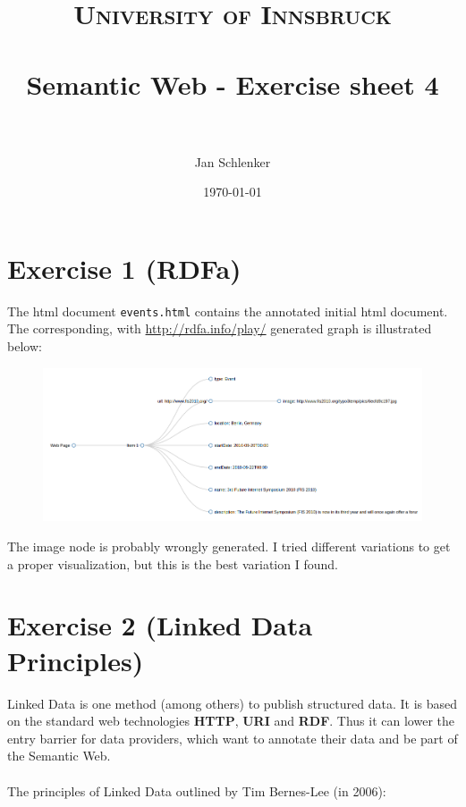 \documentclass[paper=a4, fontsize=12pt]{scrartcl} %
\title{	
\normalfont \normalsize 
\textsc{University of Innsbruck} \\ [25pt] %
\horrule{0.5pt} \\[0.4cm] %
\huge Semantic Web - Exercise sheet 4 \\ %
\horrule{2pt} \\[0.5cm] %
}
\author{Jan Schlenker} %
\date{\normalsize\today} %
\begin{document}
\maketitle %


\section{Exercise 1 (RDFa)}

The html document \texttt{events.html} contains the annotated initial html document. The corresponding, with \href{http://rdfa.info/play/}{http://rdfa.info/play/} generated graph is illustrated below:

\begin{figure}[htbp]
  \centering
  \includegraphics[width=\textwidth]{graph.png}
\end{figure}

The image node is probably wrongly generated. I tried different variations to get a proper visualization, but this is the best variation I found.



\section{Exercise 2 (Linked Data Principles)}

Linked Data is one method (among others) to publish structured data. It is based on the standard web technologies \textbf{HTTP}, \textbf{URI} and \textbf{RDF}. Thus it can lower the entry barrier for data providers, which want to annotate their data and be part of the Semantic Web. \\
\\
The principles of Linked Data outlined by Tim Bernes-Lee (in 2006):
\end{document}
